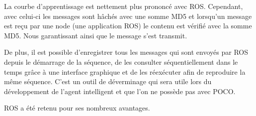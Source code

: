 La courbe d’apprentissage est nettement plus prononcé avec ROS. Cependant, avec celui-ci les messages sont hâchés avec une somme MD5 et lorsqu’un message est reçu par une node (une application ROS) le contenu est vérifié avec la somme MD5. Nous garantissant ainsi que le message s’est transmit.

De plus, il est possible d’enregistrer tous les messages qui sont envoyés par ROS depuis le démarrage de la séquence, de les consulter séquentiellement dans le temps grâce à une interface graphique et de les réexécuter afin de reproduire la même séquence. C’est un outil de déverminage qui sera utile lors du développement de l’agent intelligent et que l’on ne possède pas avec POCO.

ROS a été retenu pour ses nombreux avantages. 
